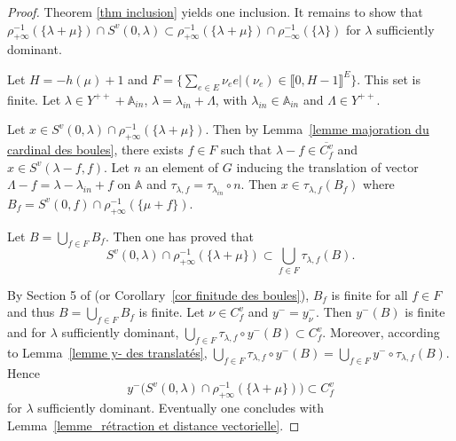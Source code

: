 \documentclass[12pt]{article}
\theoremstyle{plain}
\theoremstyle{definition}
\newcommand{\A}{\mathbb{A}}
\begin{document}
 
\begin{proof} Theorem \ref{thm inclusion} yields one inclusion. It remains to show that $\rho_{+\infty}^{-1}(\{\lambda+\mu\})\cap S^v(0,\lambda)\subset\rho_{+\infty}^{-1}(\{\lambda+\mu\})\cap \rho_{-\infty}^{-1}(\{\lambda\})$ 
for $\lambda$ sufficiently dominant.


Let $H=-h(\mu)+1$ and $F=\{\sum_{e\in E}\nu_e e|(\nu_e)\in \llbracket 0,H-1\rrbracket^E\}$. This set is finite. Let $\lambda\in Y^{++}+\A_{in}$, $\lambda=\lambda_{in}+\Lambda$, with $\lambda_{in}\in \A_{in}$ and $\Lambda\in Y^{++}$.

Let $x\in S^v(0,\lambda)\cap \rho_{+\infty}^{-1}(\{\lambda+\mu\})$. Then by Lemma~\ref{lemme majoration du cardinal des boules}, there exists $f\in F$ such that $\lambda-f\in \overline{C^v_f}$ and $x\in S^v(\lambda-f,f)$. Let $n$ an element of $G$ inducing the translation of vector $\Lambda-f=\lambda-\lambda_{in}+f$ on $\A$ and $\tau_{\lambda,f}=\tau_{\lambda_{in}}\circ n$. Then $x\in\tau_{\lambda,f}(B_f)$ where $B_f=S^v(0,f)\cap \rho_{+\infty}^{-1}(\{\mu +f\})$.

Let $B=\bigcup_{f\in F}B_f$. Then one has proved that \[S^v(0,\lambda)\cap \rho_{+\infty}^{-1}(\{\lambda+\mu\})\subset \bigcup_{f\in F}\tau_{\lambda,f}(B).\]

By Section 5 of \cite{gaussent2014spherical} (or Corollary~\ref{cor finitude des boules}), $B_f$ is finite for all $f\in F$ and thus $B=\bigcup_{f\in F}B_f$ is finite.  Let $\nu\in C_f^v$ and $y^-=y_\nu^-$. Then $y^-(B)$ is finite and for $\lambda$ sufficiently dominant, $\bigcup_{f\in F}\tau_{\lambda,f}\circ y^-(B) \subset{C^v_f}$. Moreover, according to Lemma~\ref{lemme y- des translatés}, $\bigcup_{f\in F}\tau_{\lambda,f}\circ y^-(B)=\bigcup_{f\in F}y^-\circ \tau_{\lambda,f}(B)$. Hence \[y^-\big(S^v(0,\lambda)\cap \rho_{+\infty}^{-1}(\{\lambda+\mu\})\big)\subset C^v_f\] for $\lambda$ sufficiently dominant. Eventually one concludes with Lemma~\ref{lemme_rétraction et distance vectorielle}.  
\end{proof}





 
\end{document}
